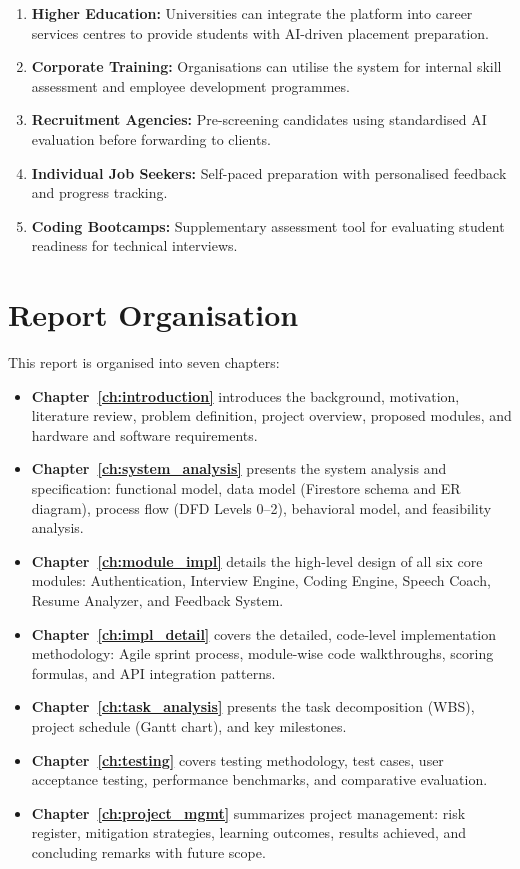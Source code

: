 \documentclass[12pt,a4paper,oneside]{report}
\begin{document}
\begin{enumerate}
  \item \textbf{Higher Education:} Universities can integrate the platform into career services centres to provide students with AI-driven placement preparation.
  \item \textbf{Corporate Training:} Organisations can utilise the system for internal skill assessment and employee development programmes.
  \item \textbf{Recruitment Agencies:} Pre-screening candidates using standardised AI evaluation before forwarding to clients.
  \item \textbf{Individual Job Seekers:} Self-paced preparation with personalised feedback and progress tracking.
  \item \textbf{Coding Bootcamps:} Supplementary assessment tool for evaluating student readiness for technical interviews.
\end{enumerate}


\section{Report Organisation}
\label{sec:organisation}

This report is organised into seven chapters:

\begin{itemize}
  \item \textbf{Chapter~\ref{ch:introduction}} introduces the background, motivation, literature review, problem definition, project overview, proposed modules, and hardware and software requirements.
  \item \textbf{Chapter~\ref{ch:system_analysis}} presents the system analysis and specification: functional model, data model (Firestore schema and ER diagram), process flow (DFD Levels 0--2), behavioral model, and feasibility analysis.
  \item \textbf{Chapter~\ref{ch:module_impl}} details the high-level design of all six core modules: Authentication, Interview Engine, Coding Engine, Speech Coach, Resume Analyzer, and Feedback System.
  \item \textbf{Chapter~\ref{ch:impl_detail}} covers the detailed, code-level implementation methodology: Agile sprint process, module-wise code walkthroughs, scoring formulas, and API integration patterns.
  \item \textbf{Chapter~\ref{ch:task_analysis}} presents the task decomposition (WBS), project schedule (Gantt chart), and key milestones.
  \item \textbf{Chapter~\ref{ch:testing}} covers testing methodology, test cases, user acceptance testing, performance benchmarks, and comparative evaluation.
  \item \textbf{Chapter~\ref{ch:project_mgmt}} summarizes project management: risk register, mitigation strategies, learning outcomes, results achieved, and concluding remarks with future scope.
\end{itemize}
\end{document}
